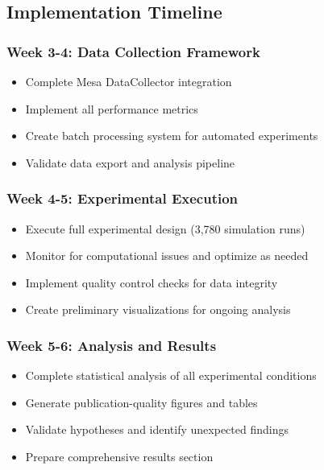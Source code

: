 \documentclass[12pt,a4paper]{article}
\begin{document}
\subsection{Implementation Timeline}

\subsubsection{Week 3-4: Data Collection Framework}

\begin{itemize}
    \item Complete Mesa DataCollector integration
    \item Implement all performance metrics
    \item Create batch processing system for automated experiments
    \item Validate data export and analysis pipeline
\end{itemize}

\subsubsection{Week 4-5: Experimental Execution}

\begin{itemize}
    \item Execute full experimental design (3,780 simulation runs)
    \item Monitor for computational issues and optimize as needed
    \item Implement quality control checks for data integrity
    \item Create preliminary visualizations for ongoing analysis
\end{itemize}

\subsubsection{Week 5-6: Analysis and Results}

\begin{itemize}
    \item Complete statistical analysis of all experimental conditions
    \item Generate publication-quality figures and tables
    \item Validate hypotheses and identify unexpected findings
    \item Prepare comprehensive results section
\end{itemize}
\end{document}
